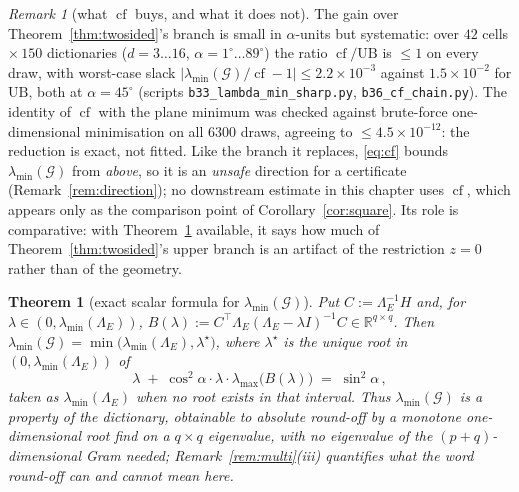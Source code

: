 \documentclass[11pt]{article}
\newtheorem{theorem}{Theorem}[section]
\theoremstyle{remark}
\newtheorem{remark}{Remark}[section]
\newcommand{\Gr}{\mathcal{G}}
\newcommand{\Le}{\Lambda_E}
\begin{document}
\begin{remark}[what $\operatorname{cf}$ buys, and what it does not]\label{rem:cf}
The gain over Theorem~\ref{thm:twosided}'s branch is small in $\alpha$-units but systematic: over
$42$ cells $\times\,150$ dictionaries ($d=3\ldots16$, $\alpha=1^\circ\ldots89^\circ$) the ratio
$\operatorname{cf}/\mathrm{UB}$ is $\le1$ on every draw, with worst-case slack
$|\lambda_{\min}(\Gr)/\operatorname{cf}-1|\le2.2\times10^{-3}$ against
$1.5\times10^{-2}$ for $\mathrm{UB}$, both at $\alpha=45^\circ$
(scripts \texttt{b33\_lambda\_min\_sharp.py}, \texttt{b36\_cf\_chain.py}). The identity of
$\operatorname{cf}$ with the plane minimum was checked against brute-force one-dimensional
minimisation on all $6300$ draws, agreeing to $\le4.5\times10^{-12}$: the reduction is exact, not
fitted. Like the branch it replaces, \eqref{eq:cf} bounds $\lambda_{\min}(\Gr)$ from \emph{above}, so
it is an \emph{unsafe} direction for a certificate (Remark~\ref{rem:direction}); no downstream
estimate in this chapter uses $\operatorname{cf}$, which appears only as the comparison point of
Corollary~\ref{cor:square}. Its role is comparative: with Theorem~\ref{thm:exact} available, it says
how much of Theorem~\ref{thm:twosided}'s upper branch is an artifact of the restriction $z=0$ rather
than of the geometry.
\end{remark}

\begin{theorem}[exact scalar formula for $\lambda_{\min}(\Gr)$]\label{thm:exact}
Put $C:=\Le^{-1}H$ and, for $\lambda\in(0,\lambda_{\min}(\Le))$,
$B(\lambda):=C^{\top}\Le(\Le-\lambda I)^{-1}C\in\mathbb{R}^{q\times q}$. Then
$\lambda_{\min}(\Gr)=\min\bigl(\lambda_{\min}(\Le),\lambda^{\star}\bigr)$, where
$\lambda^{\star}$ is the unique root in $(0,\lambda_{\min}(\Le))$ of
\begin{equation}\label{eq:exact}
  \lambda\;+\;\cos^{2}\alpha\cdot\lambda\cdot\lambda_{\max}\!\bigl(B(\lambda)\bigr)
  \;=\;\sin^{2}\alpha\,,
\end{equation}
taken as $\lambda_{\min}(\Le)$ when no root exists in that interval. Thus
$\lambda_{\min}(\Gr)$ is a property of the dictionary, obtainable to \emph{absolute} round-off by a
monotone one-dimensional root find on a $q\times q$ eigenvalue, with no eigenvalue of the
$(p+q)$-dimensional Gram needed; Remark~\ref{rem:multi}(iii) quantifies what the word
\emph{round-off} can and cannot mean here.
\end{theorem}
\end{document}
